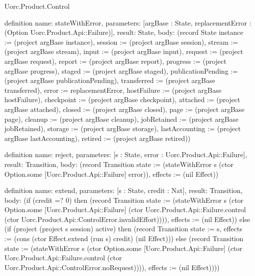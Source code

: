 \begin{lexlean}{Uorc.Product.Control}
\begin{semanticmodule}
definition{
  name: stateWithError,
  parameters: [argBase : State, replacementError : (Option Uorc.Product.Api::Failure)],
  result: State,
  body: (record State {instance := (project argBase instance), session := (project argBase session), stream := (project argBase stream), input := (project argBase input), request := (project argBase request), report := (project argBase report), progress := (project argBase progress), staged := (project argBase staged), publicationPending := (project argBase publicationPending), transferred := (project argBase transferred), error := replacementError, hostFailure := (project argBase hostFailure), checkpoint := (project argBase checkpoint), attached := (project argBase attached), closed := (project argBase closed), page := (project argBase page), cleanup := (project argBase cleanup), jobRetained := (project argBase jobRetained), storage := (project argBase storage), lastAccounting := (project argBase lastAccounting), retired := (project argBase retired)})
}

definition{
  name: reject,
  parameters: [s : State, error : Uorc.Product.Api::Failure],
  result: Transition,
  body: (record Transition {state := (stateWithError s (ctor Option.some [Uorc.Product.Api::Failure] error)), effects := (nil Effect)})
}

definition{
  name: extend,
  parameters: [s : State, credit : Nat],
  result: Transition,
  body: (if (credit =? 0) then (record Transition {state := (stateWithError s (ctor Option.some [Uorc.Product.Api::Failure] (ctor Uorc.Product.Api::Failure.control (ctor Uorc.Product.Api::ControlError.invalidEffort)))), effects := (nil Effect)}) else (if (project (project s session) active) then (record Transition {state := s, effects := (cons (ctor Effect.extend (run s) credit) (nil Effect))}) else (record Transition {state := (stateWithError s (ctor Option.some [Uorc.Product.Api::Failure] (ctor Uorc.Product.Api::Failure.control (ctor Uorc.Product.Api::ControlError.noRequest)))), effects := (nil Effect)})))
}


\end{semanticmodule}
\end{lexlean}
